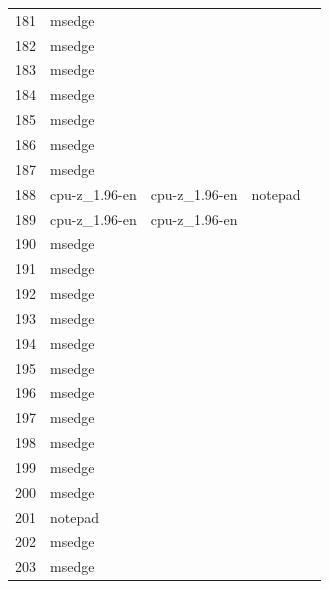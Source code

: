 \documentclass[a4paper,twoside,12pt]{book}
\begin{document}
\begin{appendices}
\begin{table}
\begin{tabular}{lllll}
	181 &         msedge &                &                &                \\
	182 &         msedge &                &                &                \\
	183 &         msedge &                &                &                \\
	184 &         msedge &                &                &                \\
	185 &         msedge &                &                &                \\
	186 &         msedge &                &                &                \\
	187 &         msedge &                &                &                \\
	188 &  cpu-z\_1.96-en &  cpu-z\_1.96-en &        notepad &                \\
	189 &  cpu-z\_1.96-en &  cpu-z\_1.96-en &                &                \\
	190 &         msedge &                &                &                \\
	191 &         msedge &                &                &                \\
	192 &         msedge &                &                &                \\
	193 &         msedge &                &                &                \\
	194 &         msedge &                &                &                \\
	195 &         msedge &                &                &                \\
	196 &         msedge &                &                &                \\
	197 &         msedge &                &                &                \\
	198 &         msedge &                &                &                \\
	199 &         msedge &                &                &                \\
	200 &         msedge &                &                &                \\
	201 &        notepad &                &                &                \\
	202 &         msedge &                &                &                \\
	203 &         msedge &                &                &                \\

\end{tabular}
\end{table}
\end{appendices}
\end{document}
